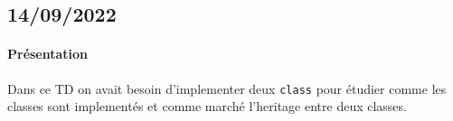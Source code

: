 \documentclass{article}
\begin{document}
\newpage\subsection{14/09/2022}
\paragraph{Présentation}Dans ce TD on avait besoin d'implementer deux \texttt{class} pour étudier comme les classes sont implementés et comme marché l'heritage entre deux classes.
\begin{scriptsize}
    \mycode
    
\end{scriptsize}
\begin{scriptsize}
    \mycode
    
\end{scriptsize}
\begin{scriptsize}
    \mycode
    
\end{scriptsize}
\end{document}
